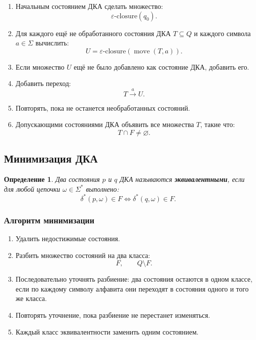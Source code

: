 \documentclass[12pt,a4paper]{article}
\newtheorem{definition}{Определение}
\newcommand{\eps}{\varepsilon}
\begin{document}
\begin{enumerate}
    \item Начальным состоянием ДКА сделать множество:
    \[
    \eps\text{-closure}(q_0).
    \]

    \item Для каждого ещё не обработанного состояния ДКА $T\subseteq Q$ и каждого символа $a\in\Sigma$ вычислить:
    \[
    U=\eps\text{-closure}(\operatorname{move}(T,a)).
    \]

    \item Если множество $U$ ещё не было добавлено как состояние ДКА, добавить его.

    \item Добавить переход:
    \[
    T\xrightarrow{a}U.
    \]

    \item Повторять, пока не останется необработанных состояний.

    \item Допускающими состояниями ДКА объявить все множества $T$, такие что:
    \[
    T\cap F\ne\varnothing.
    \]
\end{enumerate}

\subsection{Минимизация ДКА}

\begin{definition}
Два состояния $p$ и $q$ ДКА называются \textbf{эквивалентными}, если для любой цепочки $\omega\in\Sigma^*$ выполнено:
\[
\delta^*(p,\omega)\in F
\Longleftrightarrow
\delta^*(q,\omega)\in F.
\]
\end{definition}

\subsubsection*{Алгоритм минимизации}

\begin{enumerate}
    \item Удалить недостижимые состояния.
    \item Разбить множество состояний на два класса:
    \[
    F,\qquad Q\setminus F.
    \]
    \item Последовательно уточнять разбиение: два состояния остаются в одном классе, если по каждому символу алфавита они переходят в состояния одного и того же класса.
    \item Повторять уточнение, пока разбиение не перестанет изменяться.
    \item Каждый класс эквивалентности заменить одним состоянием.
\end{enumerate}
\end{document}
